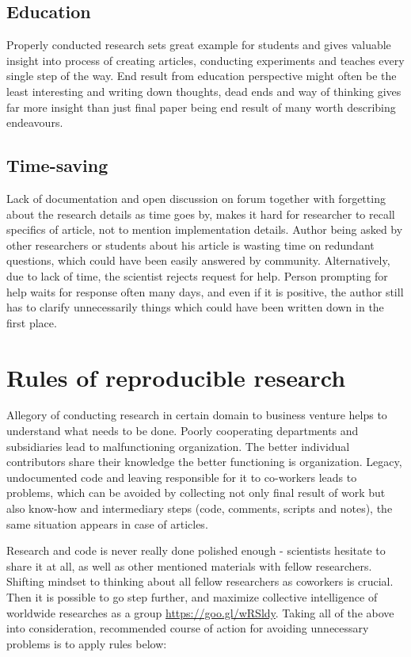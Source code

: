 \documentclass[a4paper, 12pt, oneside]{Thesis} %
\begin{document}
\subsection{Education} Properly conducted research sets great example for students and gives valuable insight into process of creating articles, conducting experiments and teaches every single step of the way. End result from education perspective might often be the least interesting and writing down thoughts, dead ends and way of thinking gives far more insight than just final paper being end result of many worth describing endeavours.

\subsection{Time-saving} Lack of documentation and open discussion on forum together with forgetting about the research details as time goes by, makes it hard for researcher to recall specifics of article, not to mention implementation details. Author being asked by other researchers or students about his article is wasting time on redundant questions, which could have been easily answered by community. Alternatively, due to lack of time, the scientist rejects request for help. Person prompting for help waits for response often many days, and even if it is positive, the author still has to clarify unnecessarily things which could have been written down in the first place.

\section{Rules of reproducible research} Allegory of conducting research in certain domain to business venture helps to understand what needs to be done. Poorly cooperating departments and subsidiaries lead to malfunctioning organization. The better individual contributors share their knowledge the better functioning is organization. Legacy, undocumented code and leaving responsible for it to co-workers leads to problems, which can be avoided by collecting not only final result of work but also know-how and intermediary steps (code, comments, scripts and notes), the same situation appears in case of articles. 

Research and code is never really done polished enough - scientists hesitate to share it at all, as well as other mentioned materials with fellow researchers. Shifting mindset to thinking about all fellow researchers as coworkers is crucial. Then it is possible to go step further, and maximize collective intelligence of worldwide researches as a group \url{https://goo.gl/wRSldy}. Taking all of the above into consideration, recommended course of action for avoiding unnecessary problems is to apply rules below:
\end{document}
